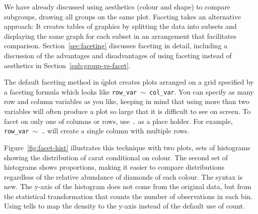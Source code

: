 We have already discussed using aesthetics (colour and shape) to compare subgroups, drawing all groups on the same plot. Faceting takes an alternative approach: It creates tables of graphics by splitting the data into subsets and displaying the same graph for each subset in an arrangement that facilitates comparison. Section~\ref{sec:faceting} discusses faceting in detail, including a discussion of the advantages and disadvantages of using faceting instead of aesthetics in Section~\ref{sub:group-vs-facet}. 

The default faceting method in \f{qplot} creates plots arranged on a grid specified by a faceting formula which looks like {\tt row\_var $\sim$ col\_var}.  You can specify as many row and column variables as you like, keeping in mind that using more than two variables will often produce a plot so large that it is difficult to see on screen.  To facet on only one of columns or rows, use {\tt .} as a place holder.  For example, {\tt row\_var $\sim$ .} will create a single column with multiple rows. 


Figure~\ref{fig:facet-hist} illustrates this technique with two plots, sets of histograms showing the distribution of carat conditional on colour.
The second set of histograms shows proportions, making it easier to compare distributions regardless of the relative abundance of diamonds of each colour. The  syntax is new. The y-axis of the histogram does not come from the original data, but from the statistical transformation that counts the number of observations in each bin.  Using  tells \ggplot to map the density to the y-axis instead of the default use of count.  

% 



